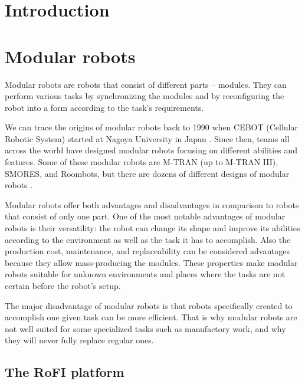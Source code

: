 \documentclass[
  digital, %
  table,   %
  oneside, %
  nolof,     %
  nolot,     %
]{fithesis3}
\begin{document}
\chapter{Introduction}



\chapter{Modular robots}

Modular robots are robots that consist of different parts -- modules.
They can perform various tasks by synchronizing the modules and by reconfiguring the robot into a form according to the task's requirements.

We can trace the origins of modular robots back to 1990 when CEBOT (Cellular Robotic System) started at Nagoya University in Japan \cite{current-trends}.
Since then, teams all across the world have designed modular robots focusing on different abilities and features.
Some of these modular robots are M-TRAN (up to M-TRAN III)\cite{mtran}, SMORES\cite{smores}, and Roombots\cite{roombots}, but there are dozens of different designs of modular robots \cite{current-trends}.

Modular robots offer both advantages and disadvantages in comparison to robots that consist of only one part.
One of the most notable advantages of modular robots is their versatility: the robot can change its shape and improve its abilities according to the environment as well as the task it has to accomplish.
Also the production cost, maintenance, and replaceability can be considered advantages because they allow mass-producing the modules.
These properties make modular robots suitable for unknown environments and places where the tasks are not certain before the robot's setup.

The major disadvantage of modular robots is that robots specifically created to accomplish one given task can be more efficient.
That is why modular robots are not well suited for some specialized tasks such as manufactory work, and why they will never fully replace regular ones.

\section{The RoFI platform}
\end{document}
